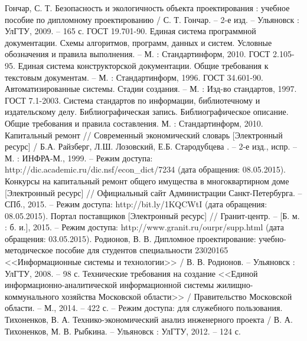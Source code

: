 \renewcommand{\refname}{Список использованных источников}

\begin{thebibliography}{99}

	 Гончар, С. Т. Безопасность и экологичность объекта проектирования : учебное пособие по дипломному проектированию / С. Т. Гончар. – 2-е изд. – Ульяновск : УлГТУ, 2009. – 165 с.
	 ГОСТ 19.701-90. Единая система программной документации. Схемы алгоритмов, программ, данных и систем. Условные обозначения и правила выполнения. – М. : Стандартинформ, 2010.
	 ГОСТ 2.105-95. Единая система конструкторской документации. Общие требования к текстовым документам. – М. : Стандартинформ, 1996.
	 ГОСТ 34.601-90. Автоматизированные системы. Стадии создания. – М. : Изд-во стандартов, 1997.
	 ГОСТ 7.1-2003. Система стандартов по информации, библиотечному и издательскому делу. Библиографическая запись. Библиографическое описание. Общие требования и правила составления.  М. : Стандартинформ, 2010.
	 Капитальный ремонт // Современный экономический словарь [Электронный ресурс] / Б.А. Райзберг, Л.Ш. Лозовский, Е.Б. Стародубцева . – 2-е изд., испр. – М. : ИНФРА-М., 1999. – Режим доступа: http://dic.academic.ru/dic.nsf/econ\_dict/7234 (дата обращения: 08.05.2015).
	 Конкурсы на капитальный ремонт общего имущества в многоквартирном доме [Электронный ресурс] // Официальный сайт Администрации Санкт-Петербурга. – СПб., 2015. – Режим доступа: http://bit.ly/1KQCWtI (дата обращения: 08.05.2015).
	 Портал поставщиков [Электронный ресурс] // Гранит-центр. – [Б. м. : б. и.], 2015. – Режим доступа: http://www.granit.ru/ourpr/supp.html (дата обращения: 03.05.2015).
	 Родионов, В. В. Дипломное проектирование: учебно-методическое пособие для студентов специальности 23020165 <<Информационные системы и технологии>> / В. В. Родионов. – Ульяновск : УлГТУ, 2008. – 98 с.
	 Технические требования на создание <<Единой информационно-аналитической информационной системы жилищно-коммунального хозяйства Московской области>> / Правительство Московской области. – М., 2014. – 422 с. – Режим доступа: для служебного пользования.
	 Тихоненков, В. А. Технико-экономический анализ инженерного проекта / В. А. Тихоненков, М. В. Рыбкина. – Ульяновск : УлГТУ, 2012. – 124 с.

\end{thebibliography}
